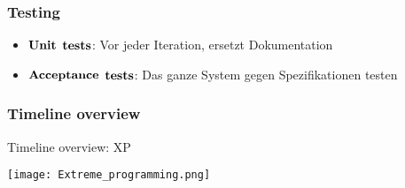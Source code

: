 \subsubsection{Testing}
\begin{itemize}
	\item $\bold{Unit}$ $\bold{tests}$: Vor jeder Iteration, ersetzt Dokumentation
	\item $\bold{Acceptance}$ $\bold{tests}$: Das ganze System gegen Spezifikationen testen 
\end{itemize}
\subsubsection{Timeline overview}
\begin{table}[H]
\caption{Timeline overview: XP}
\texttt{[image: Extreme\_programming.png]}	
\end{table}




